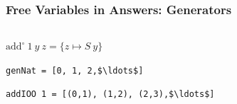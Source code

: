 \documentclass[xcolor=table, aspectratio=169]{beamer}
\newcommand{\mk}{\textsc{miniKanren}\xspace}
\begin{document}
%     










\begin{frame}[fragile]
  \frametitle{Free Variables in Answers: Generators}
\begin{columns}
  \begin{column}[t]{0.49\textwidth}
    

    \vspace{0.5cm}
    $\text{add}^{\circ}\ 1\ y\ z = \{z \mapsto S\ y\}$

    \vspace{0.5cm}

    \lstinline{genNat = [0, 1, 2,$\ldots$]}

    \vspace{0.5cm}

    \lstinline{addIOO 1 = [(0,1), (1,2), (2,3),$\ldots$]} 
  \end{column}
  \begin{column}[t]{0.49\textwidth}
    
  \end{column}
\end{columns}
\end{frame}
\end{document}
